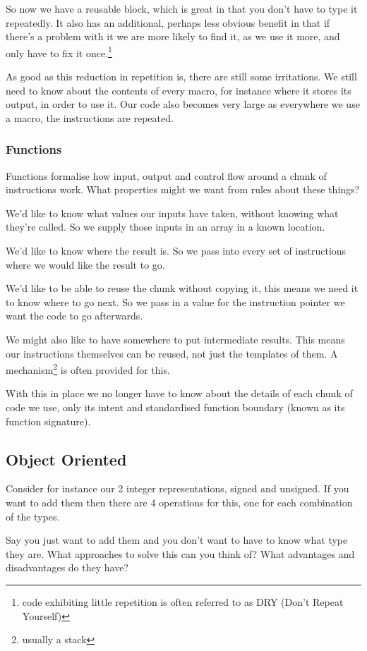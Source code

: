 \documentclass{article}
\begin{document}
So now we have a reusable block, which is great in that you don't have to type
it repeatedly.  It also has an additional, perhaps less obvious benefit in that
if there's a problem with it we are more likely to find it, as we use it more,
and only have to fix it once.\footnote{
code exhibiting little repetition is often referred to as DRY
(Don't Repeat Yourself)}

As good as this reduction in repetition is, there are still some irritations.
We still need to know about the contents of every macro, for instance where it
stores its output, in order to use it.
Our code also becomes very large as everywhere we use a macro, the
instructions are repeated.
\subsubsection{Functions}
Functions formalise how input, output and control flow around a chunk of
instructions work.
What properties might we want from rules about these things?

We'd like to know what values our inputs have taken, without knowing what
they're called.
So we supply those inputs in an array in a known location.

We'd like to know where the result is.
So we pass into every set of instructions where we would like the result to go.

We'd like to be able to reuse the chunk without copying it, this means we need
it to know where to go next.
So we pass in a value for the instruction pointer we want the code to go afterwards.

We might also like to have somewhere to put intermediate results.
This means our instructions themselves can be reused, not just the templates of them.
A mechanism\footnote{usually a stack} is often provided for this.

With this in place we no longer have to know about the details of each chunk of
code we use, only its intent and standardised function boundary (known as its
function signature).

\subsection{Object Oriented}
Consider for instance our 2 integer representations, signed and unsigned.
If you want to add them then there are 4 operations for this, one for each
combination of the types.

Say you just want to add them and you don't want to have to know what type they are.
What approaches to solve this can you think of?
What advantages and disadvantages do they have?
\end{document}
